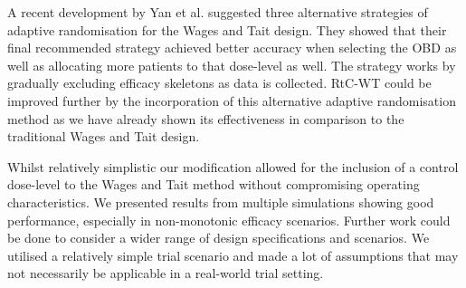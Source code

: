 A recent development by Yan et al. \cite{yanImprovedAdaptiveRandomization2019} suggested three alternative strategies of adaptive randomisation for the Wages and Tait design. They showed that their final recommended strategy achieved better accuracy when selecting the OBD as well as allocating more patients to that dose-level as well. The strategy works by gradually excluding efficacy skeletons as data is collected. RtC-WT could be improved further by the incorporation of this alternative adaptive randomisation method as we have already shown its effectiveness in comparison to the traditional Wages and Tait design.  

Whilst relatively simplistic our modification allowed for the inclusion of a control dose-level to the Wages and Tait method without compromising operating characteristics. We presented results from multiple simulations showing good performance, especially in non-monotonic efficacy scenarios. Further work could be done to consider a wider range of design specifications and scenarios. We utilised a relatively simple trial scenario and made a lot of assumptions that may not necessarily  be applicable in a real-world trial setting.  

